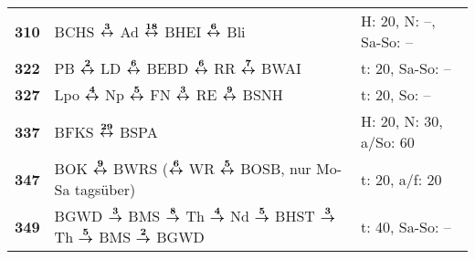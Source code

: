 \begin{minipage}[t]{0.45\textwidth}
\begin{tabular}{>{\bfseries}L{1.2cm}L{9.0cm}L{3.0cm}}
\bus{} 310    & BCHS $\boldsymbol{\overset{3}{\leftrightarrow}}$ Ad $\boldsymbol{\overset{18}{\leftrightarrow}}$ BHEI $\boldsymbol{\overset{6}{\leftrightarrow}}$ Bli                                                                                                               & H: 20, N: --, Sa-So: --    \\
\bus{} 322    & PB $\boldsymbol{\overset{2}{\leftrightarrow}}$ LD $\boldsymbol{\overset{6}{\leftrightarrow}}$ BEBD $\boldsymbol{\overset{6}{\leftrightarrow}}$ RR $\boldsymbol{\overset{7}{\leftrightarrow}}$ BWAI                                                                                                  & t: 20, Sa-So: --           \\
\bus{} 327    & Lpo $\boldsymbol{\overset{4}{\leftrightarrow}}$ Np $\boldsymbol{\overset{5}{\leftrightarrow}}$ FN $\boldsymbol{\overset{3}{\leftrightarrow}}$ RE $\boldsymbol{\overset{9}{\leftrightarrow}}$ BSNH                                                                                                   & t: 20, So: --              \\
\bus{} 337    & BFKS $\boldsymbol{\overset{29}{\leftrightarrow}}$ BSPA                                                                                                                                              & H: 20, N: 30, a/So: 60     \\
\bus{} 347    & BOK $\boldsymbol{\overset{9}{\leftrightarrow}}$ BWRS ($\boldsymbol{\overset{6}{\leftrightarrow}}$ WR $\boldsymbol{\overset{5}{\leftrightarrow}}$ BOSB, nur Mo-Sa tagsüber)                                                                                          & t: 20, a/f: 20             \\
\bus{} 349    & BGWD $\boldsymbol{\overset{3}{\rightarrow}}$ BMS $\boldsymbol{\overset{8}{\rightarrow}}$ Th $\boldsymbol{\overset{4}{\rightarrow}}$ Nd $\boldsymbol{\overset{5}{\rightarrow}}$ BHST $\boldsymbol{\overset{3}{\rightarrow}}$ Th $\boldsymbol{\overset{5}{\rightarrow}}$ BMS $\boldsymbol{\overset{2}{\rightarrow}}$ BGWD                                                 & t: 40, Sa-So: --           \\
\hline
\end{tabular}
\end{minipage}
